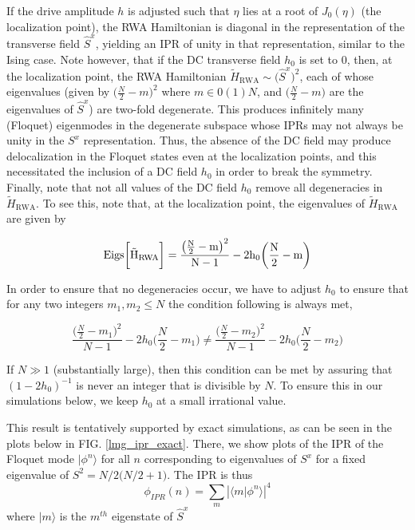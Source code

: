 \documentclass[%
 reprint,
superscriptaddress,
 amsmath,amssymb,
 aps,
prb,
]{revtex4-2}
\begin{document}
If the drive amplitude $h$ is adjusted such that $\eta$ lies at a root of $J_0(\eta)$ (the localization point), the RWA Hamiltonian is diagonal in the representation of the transverse field $\hat{S}^x$, yielding an IPR of unity in that representation, similar to the Ising case. Note however, that if the DC transverse field $h_0$ is set to $0$, then, at the localization point, the RWA Hamiltonian $\tilde{H}_{\mathrm{RWA}}\sim
\big(\hat{S}^x\big)^2$, each of whose eigenvalues (given by $\big(\frac{N}{2}-m\big)^2$ where $m \in 0(1)N$, and $\big(\frac{N}{2}-m\big)$  are the eigenvalues of $\hat{S}^x$) are two-fold degenerate. This produces infinitely many (Floquet) eigenmodes in the degenerate subspace whose IPRs may not always be unity in the $S^x$ representation. Thus, the absence of the DC field may produce delocalization in the Floquet states even at the localization points, and this necessitated the inclusion of a DC field $h_0$ in order to break the symmetry.
Finally, note that not all values of the DC field $h_0$ remove all degeneracies in $\tilde{H}_{\mathrm{RWA}}$. To see this, note that, at the localization point, the eigenvalues of $\tilde{H}_{\mathrm{RWA}}$ are given by

\begin{equation}
	\rm{Eigs}\bigg[\tilde{H}_{\mathrm{RWA}}\bigg] = \frac{\big(\frac{N}{2}-m\big)^2}{N-1} - 2h_0 \bigg(\frac{N}{2}-m\bigg)
\end{equation}

In order to ensure that no degeneracies occur, we have to adjust $h_0$ to ensure that for any two integers $m_1, m_2 \leq N$  the condition following is always met,

\begin{equation}
	\frac{\big(\frac{N}{2}-m_1\big)^2}{N-1} - 2h_0 \bigg(\frac{N}{2}-m_1\bigg) \neq \frac{\big(\frac{N}{2}-m_2\big)^2}{N-1} - 2h_0 \bigg(\frac{N}{2}-m_2\bigg)
\end{equation}

If $N\gg 1$ (substantially large), then this condition can be met by assuring that $(1-2h_0)^{-1}$ is never an integer that is divisible by $N$. To ensure this in our simulations below, we keep $h_0$ at a small irrational value.


This result is tentatively supported by exact simulations, as can be seen in the plots below in FIG. \ref{lmg_ipr_exact}. There, we show plots of the IPR of the Floquet mode $|\phi^n\rangle$ for all $n$ corresponding to eigenvalues of $S^x$ for a fixed eigenvalue of $S^2 = N/2\big(N/2 + 1\big)$. The IPR is thus
\begin{equation}
	\phi_{IPR}(n) = \sum_m \left\vert\langle m\vert\phi^n\rangle\right\vert^4
	\label{iprlmg}
\end{equation}
where $|m\rangle$ is the $m^{th}$ eigenstate of $\hat{S}^x$
\end{document}
